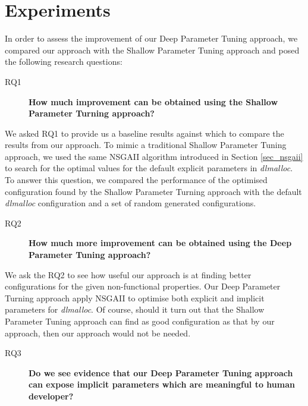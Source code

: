 
\section{Experiments}

In order to assess the improvement of our Deep Parameter Tuning approach, we compared our approach with the Shallow Parameter Tuning approach and posed the following research questions: 
 

\begin{description}
 \item[RQ1] {\bf How much improvement can be obtained using the Shallow Parameter Turning approach? }
\end{description}

We asked RQ1 to provide us a baseline results against which to compare the results from our approach. To mimic a traditional Shallow Parameter Tuning approach, we used the same NSGAII algorithm introduced in Section \ref{sec_nsgaii} to search for the optimal values for the default explicit parameters in \emph{dlmalloc}. To answer this question, we compared the performance of the optimised configuration found by the Shallow Parameter Turning approach with the default \emph{dlmalloc} configuration and a set of random generated configurations.  %

\begin{description}
\item[RQ2] {\bf How much more improvement can be obtained using the Deep Parameter Tuning approach? }
\end{description}

We ask the RQ2 to see how useful our approach is at finding better configurations for the given non-functional properties. Our Deep Parameter Turning approach apply NSGAII to optimise both explicit and implicit parameters for \emph{dlmalloc}. Of course, should it turn out that the Shallow Parameter Tuning approach can find as good configuration as that by our approach, then our approach would not be needed. 

\begin{description}
\item[RQ3] {\bf Do we see evidence that our Deep Parameter Tuning approach can expose implicit parameters which are meaningful to human developer? }
\end{description} 

